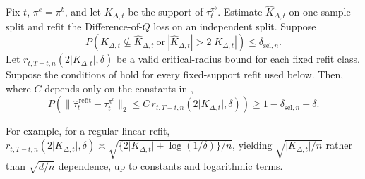 \documentclass[opre,nonblindrev]{informs4}
\newenvironment{revision}{\begingroup\color{revisionblue}\ignorespaces}{\endgroup}
\newcommand{\norm}[1]{\lVert#1\rVert}
\newcommand{\blipadv}{\tau}
\begin{document}
\begin{revision}
\begin{corollary}
\label{cor:dimension-adaptation}
Fix $t$, $\pi^e=\pi^b$, and let
$K_{\Delta,t}$ be the support of
$\blipadv_t^{\pi^b}$.
Estimate $\hat K_{\Delta,t}$ on one sample split and refit the
Difference-of-$Q$ loss on an independent split. Suppose
\begin{equation*}
P\!\left(
K_{\Delta,t}\nsubseteq\hat K_{\Delta,t}
\ \text{or}\
|\hat K_{\Delta,t}|>2|K_{\Delta,t}|
\right)
\le \delta_{\mathrm{sel},n}.
\end{equation*}
Let $r_{t,T-t,n}(2\lvert K_{\Delta,t}\rvert,\delta)$ be a valid
critical-radius bound for each fixed refit class. 
Suppose the conditions of
 hold for every fixed-support refit used below.
Then, where $C$ depends only on the constants in
,
\begin{equation*}
P\left(
  \norm{\hat\blipadv_t^{\,\mathrm{refit}}
       -\blipadv_t^{\pi^b}}_2
 \le C\,r_{t,T-t,n}(2\lvert K_{\Delta,t}\rvert,\delta)
\right)
\ge 1-\delta_{\mathrm{sel},n}-\delta.
\end{equation*}
\end{corollary}

For example, for a regular linear refit,
$r_{t,T-t,n}(2\lvert K_{\Delta,t}\rvert,\delta)\asymp
\sqrt{\{2\lvert K_{\Delta,t}\rvert+\log(1/\delta)\}/n}$, yielding
$\sqrt{\lvert K_{\Delta,t}\rvert/n}$ rather than $\sqrt{d/n}$ dependence,
up to constants and logarithmic terms.


\end{revision}



\end{document}
